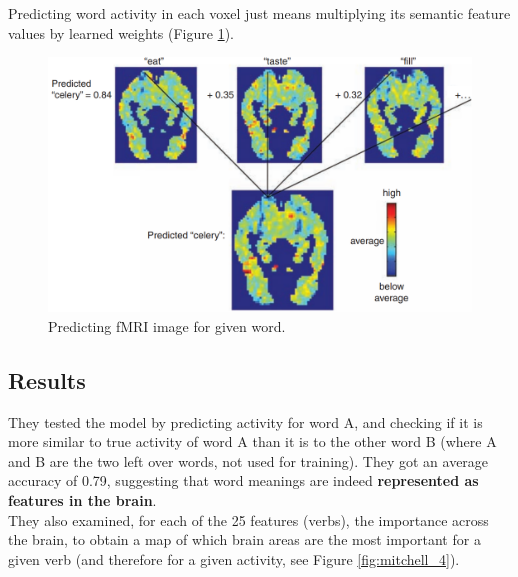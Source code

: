 
Predicting word activity in each voxel just means multiplying its semantic feature values by learned weights (Figure \ref{fig:mitchell_3}).
\begin{figure}[!ht]
    \centering
    \includegraphics[width=0.6\linewidth]{images/mitchell_3.png}
    \caption{Predicting fMRI image for given word.}
    \label{fig:mitchell_3}
\end{figure}

\subsection{Results}
They tested the model by predicting activity for word A, and checking if it is more similar to true activity of word A than it is to the other word B (where A and B are the two left over words, not used for training). They got an average accuracy of 0.79, suggesting that word meanings are indeed \textbf{represented as features in the brain}.\\

They also examined, for each of the 25 features (verbs), the importance across the brain, to obtain a map of which brain areas are the most important for a given verb (and therefore for a given activity, see Figure \ref{fig:mitchell_4}).\\

